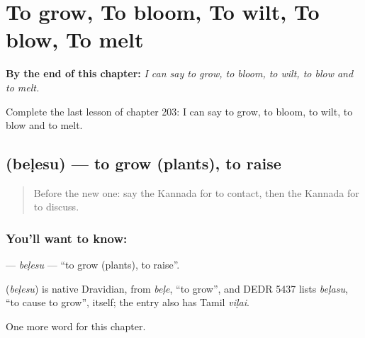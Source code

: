 
\chapter{To grow, To bloom, To wilt, To blow, To melt}
\label{ch:ka-to-grow-to-bloom-to-wilt-to-blow-to-melt}

\begin{chapteropening}
\textbf{By the end of this chapter:} \emph{I can say to grow, to bloom, to wilt, to blow and to melt.}

Complete the last lesson of chapter 203: I can say to grow, to bloom, to wilt, to blow and to melt.
\end{chapteropening}

\section[\texorpdfstring{\kn{ಬೆಳೆಸು} (beḷesu)}{ಬೆಳೆಸು (beḷesu)}]{ (beḷesu) — to grow (plants), to raise}

\label{lesson:KA-C203-belesu}



\begin{quote}
Before the new one: say the Kannada for to contact, then the Kannada for to discuss.
\end{quote}

\subsection*{You'll want to know: }
\textbf{} — \emph{beḷesu} — \textquotedblleft{}to grow (plants), to raise\textquotedblright{}.

\begin{cousinweb}
\textbf{} (\emph{beḷesu}) is native Dravidian, from \emph{beḷe}, \textquotedblleft{}to grow\textquotedblright{}, and DEDR 5437 lists \emph{beḷasu}, \textquotedblleft{}to cause to grow\textquotedblright{}, itself; the entry also has Tamil \emph{viḷai}.
\end{cousinweb}

\begin{grammarlens}[title={What you've built}]
One more word for this chapter.
\end{grammarlens}


